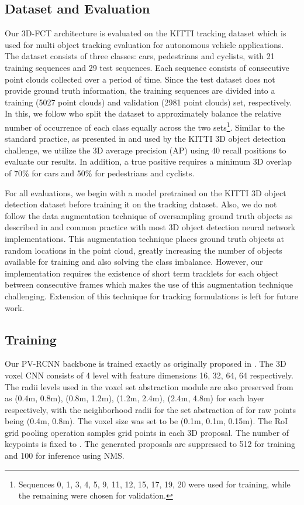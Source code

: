 \documentclass[10pt,twocolumn,letterpaper]{article}
\begin{document}
\subsection{Dataset and Evaluation}
Our 3D-FCT architecture is evaluated on the KITTI \cite{Geiger2013IJRR} tracking dataset which is used for multi object tracking evaluation for autonomous vehicle applications. The dataset consists of three classes: cars, pedestrians and cyclists, with 21 training sequences and 29 test sequences. Each sequence consists of consecutive point clouds collected over a period of time. Since the test dataset does not provide ground truth information, the training sequences are divided into a training (5027 point clouds) and validation (2981 point clouds) set, respectively. In this, we follow \cite{Voigtlaender2019} who split the dataset to approximately balance the relative number of occurrence of each class equally across the two sets\footnote{Sequences 0, 1, 3, 4, 5, 9, 11, 12, 15, 17, 19, 20 were used for training, while the remaining were chosen for validation.}. Similar to the standard practice, as presented in \cite{Simonelli2020} and used by the KITTI 3D object detection challenge, we utilize the 3D average precision (AP) using 40 recall positions to evaluate our results. In addition, a true positive requires a minimum 3D overlap of 70\% for cars and 50\% for pedestrians and cyclists.

For all evaluations, we begin with a model pretrained on the KITTI \cite{Geiger2013IJRR} 3D object detection dataset before training it on the tracking dataset. Also, we do not follow the data augmentation technique of oversampling ground truth objects as described in \cite{Cheng2020,Yan2018} and common practice with most 3D object detection neural network implementations. This augmentation technique places ground truth objects at random locations in the point cloud, greatly increasing the number of objects available for training and also solving the class imbalance. However, our implementation requires the existence of short term tracklets for each object between consecutive frames which makes the use of this augmentation technique challenging. Extension of this technique for tracking formulations is left for future work.

\subsection{Training}
 Our PV-RCNN backbone is trained exactly as originally proposed in \cite{Shi_2020_CVPR}. The 3D voxel CNN consists of 4 level with feature dimensions 16, 32, 64, 64 respectively. The radii levels used in the voxel set abstraction module are also preserved from \cite{Shi_2020_CVPR} as (0.4m, 0.8m), (0.8m, 1.2m), (1.2m, 2.4m), (2.4m, 4.8m) for each layer respectively, with the neighborhood radii for the set abstraction of for raw points being (0.4m, 0.8m). The voxel size was set to be (0.1m, 0.1m, 0.15m). The RoI grid pooling operation samples  grid points in each 3D proposal. The number of keypoints is fixed to . The generated proposals are suppressed to 512 for training and 100 for inference using NMS.
\end{document}
